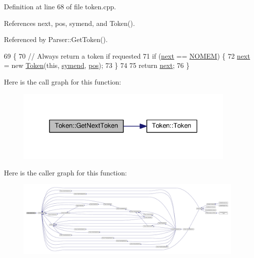 Definition at line 68 of file token.\+cpp.



References next, pos, symend, and Token().



Referenced by Parser\+::\+Get\+Token().


\begin{DoxyCode}
69 \{
70     \textcolor{comment}{// Always return a token if requested}
71     \textcolor{keywordflow}{if} (\hyperlink{structToken_a32f24a25af788c192e5b387dc8d67914}{next} == \hyperlink{platform_8h_a46ff2bfbf0d44b8466a2251d5bd5e6f8}{NOMEM}) \{
72         \hyperlink{structToken_a32f24a25af788c192e5b387dc8d67914}{next} = \textcolor{keyword}{new} \hyperlink{structToken_a6331b847b4dc8cebe0e0a79c4de63204}{Token}(\textcolor{keyword}{this}, \hyperlink{lex_8h_a7feef761cd73fac6e25b8bb80d2c4e54a9be8426421896b360944c1313abeffdb}{symend}, \hyperlink{structToken_afc3014d7e8cbd70e58a55bea24fc2544}{pos});
73     \}
74 
75     \textcolor{keywordflow}{return} \hyperlink{structToken_a32f24a25af788c192e5b387dc8d67914}{next};
76 \}
\end{DoxyCode}


Here is the call graph for this function\+:
\nopagebreak
\begin{figure}[H]
\begin{center}
\leavevmode
\includegraphics[width=306pt]{df/dcd/structToken_ac7eb963d5eff544dd48ffc23aa274356_cgraph}
\end{center}
\end{figure}




Here is the caller graph for this function\+:
\nopagebreak
\begin{figure}[H]
\begin{center}
\leavevmode
\includegraphics[width=350pt]{df/dcd/structToken_ac7eb963d5eff544dd48ffc23aa274356_icgraph}
\end{center}
\end{figure}


